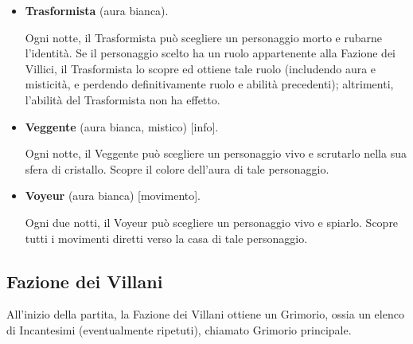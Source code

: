 \documentclass[a4paper,10pt]{article}
\begin{document}
\begin{itemize}
    \item {\bf Trasformista} (aura bianca).

          Ogni notte, il Trasformista può scegliere un personaggio morto e rubarne l'identità. Se il personaggio scelto ha un ruolo appartenente alla Fazione dei Villici, il Trasformista lo scopre ed ottiene tale ruolo (includendo aura e misticità, e perdendo definitivamente ruolo e abilità precedenti); altrimenti, l'abilità del Trasformista non ha effetto.

    \item {\bf Veggente} (aura bianca, mistico) [info].

          Ogni notte, il Veggente può scegliere un personaggio vivo e scrutarlo nella sua sfera di cristallo. Scopre il colore dell'aura di tale personaggio.

    \item {\bf Voyeur} (aura bianca) [movimento].

          Ogni due notti, il Voyeur può scegliere un personaggio vivo e spiarlo. Scopre tutti i movimenti diretti verso la casa di tale personaggio.

\end{itemize}


\subsection*{Fazione dei Villani}

All'inizio della partita, la Fazione dei Villani ottiene un Grimorio, ossia un elenco di Incantesimi (eventualmente ripetuti), chiamato Grimorio principale.
\end{document}
